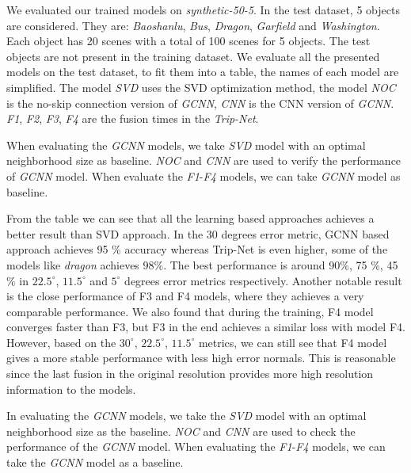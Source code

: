 We evaluated our trained models on \textit{synthetic-50-5}. In the test dataset, 5 objects are considered. They are: \textit{Baoshanlu}, \textit{Bus}, \textit{Dragon}, \textit{Garfield} and \textit{Washington}. Each object has 20 scenes with a total of 100 scenes for 5 objects. The test objects are not present in the training dataset. We evaluate all the presented models on the test dataset, to fit them into a table, the names of each model are simplified. The model \textit{SVD} uses the SVD optimization method, the model \textit{NOC} is the no-skip connection version of \textit{GCNN}, \textit{CNN} is the CNN version of \textit{GCNN}. \textit{F1}, \textit{F2}, \textit{F3}, \textit{F4} are the fusion times in the \textit{Trip-Net}. 




When evaluating the \textit{GCNN} models, we take \textit{SVD} model with an optimal neighborhood size as baseline. \textit{NOC} and \textit{CNN} are used to verify the performance of \textit{GCNN} model. When evaluate the \textit{F1}-\textit{F4} models, we can take \textit{GCNN} model as baseline. 

From the table we can see that all the learning based approaches achieves a better result than SVD approach. In the 30 degrees error metric, GCNN based approach achieves 95 \% accuracy whereas Trip-Net is even higher, some of the models like \textit{dragon} achieves 98\%. The best performance is around 90\%, 75 \%, 45 \% in $ 22.5^\circ $, $ 11.5^\circ $ and $ 5^\circ $ degrees error metrics respectively. Another notable result is the close performance of F3 and F4 models, where they achieves a very comparable performance. We also found that during the training, F4 model converges faster than F3, but F3 in the end achieves a similar loss with model F4. However, based on the $ 30^\circ $, $ 22.5^\circ $, $ 11.5^\circ $ metrics, we can still see that F4 model gives a more stable performance with less high error normals. This is reasonable since the last fusion in the original resolution provides more high resolution information to the models.



In evaluating the \textit{GCNN} models, we take the \textit{SVD} model with an optimal neighborhood size as the baseline. \textit{NOC} and \textit{CNN} are used to check the performance of the \textit{GCNN} model. When evaluating the \textit{F1}-\textit{F4} models, we can take the \textit{GCNN} model as a baseline. 

